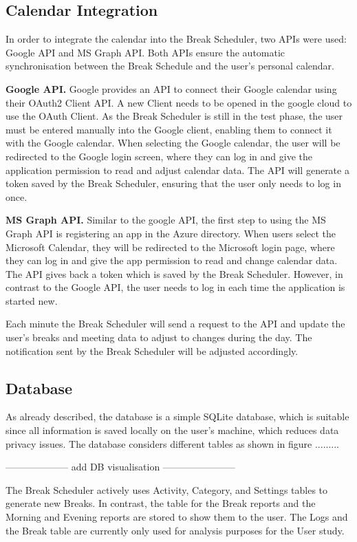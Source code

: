 \documentclass{hasel_thesis}
\begin{document}
\subsection{Calendar Integration} \label{calendar_integration}

In order to integrate the calendar into the Break Scheduler, two APIs were used: Google API and MS Graph API. Both APIs ensure the automatic synchronisation between the Break Schedule and the user's personal calendar. 

\textbf{Google API.} Google provides an API to connect their Google calendar using their OAuth2 Client API. A new Client needs to be opened in the google cloud to use the OAuth Client. As the Break Scheduler is still in the test phase, the user must be entered manually into the Google client, enabling them to connect it with the Google calendar. When selecting the Google calendar, the user will be redirected to the Google login screen, where they can log in and give the application permission to read and adjust calendar data. The API will generate a token saved by the Break Scheduler, ensuring that the user only needs to log in once.

\textbf{MS Graph API.} Similar to the google API, the first step to using the MS Graph API is registering an app in the Azure directory. When users select the Microsoft Calendar, they will be redirected to the Microsoft login page, where they can log in and give the app permission to read and change calendar data. The API gives back a token which is saved by the Break Scheduler. However, in contrast to the Google API, the user needs to log in each time the application is started new.

Each minute the Break Scheduler will send a request to the API and update the user's breaks and meeting data to adjust to changes during the day. The notification sent by the Break Scheduler will be adjusted accordingly.

\subsection{Database} \label{database}
As already described, the database is a simple SQLite database, which is suitable since all information is saved locally on the user's machine, which reduces data privacy issues. The database considers different tables as shown in figure .........

-------------------- add DB visualisation  -----------------------

The Break Scheduler actively uses Activity, Category, and Settings tables to generate new Breaks. In contrast, the table for the Break reports and the Morning and Evening reports are stored to show them to the user. The Logs and the Break table are currently only used for analysis purposes for the User study.
\end{document}
